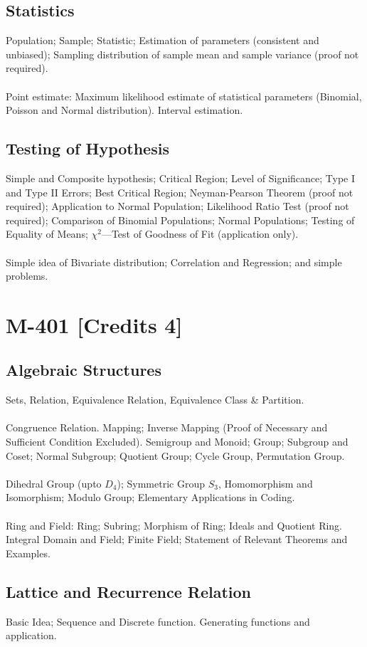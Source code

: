 \documentclass[12pt]{article}
\begin{document}
\subsection{Statistics}
Population; Sample; Statistic; Estimation of parameters (consistent and unbiased); Sampling distribution of sample mean and sample variance (proof not required).\\ \\
Point  estimate: Maximum likelihood estimate of statistical parameters (Binomial, Poisson and Normal distribution). Interval estimation.
\subsection{Testing of Hypothesis}
Simple  and  Composite  hypothesis; Critical Region; Level of Significance; Type I and Type II Errors; Best Critical  Region;  Neyman-Pearson  Theorem  (proof  not required);  Application  to  Normal  Population; Likelihood Ratio Test (proof not required); Comparison of Binomial Populations; Normal Populations; Testing of Equality of Means; $\chi^2$—Test of Goodness of Fit (application only).\\ \\
Simple idea of Bivariate distribution; Correlation and Regression; and simple problems. 

\section{M-401 [Credits 4]}
\subsection{Algebraic Structures}
Sets, Relation, Equivalence Relation, Equivalence Class \& Partition.\\ \\
Congruence Relation. Mapping; Inverse Mapping (Proof of Necessary and Sufficient Condition Excluded). Semigroup and Monoid; Group; Subgroup and Coset; Normal Subgroup; Quotient Group; Cycle Group, Permutation Group.\\ \\
Dihedral Group (upto $D_4$); Symmetric Group $S_3$, Homomorphism and Isomorphism; Modulo Group; Elementary Applications in Coding.\\ \\
Ring and Field: Ring; Subring; Morphism of Ring; Ideals and Quotient Ring. Integral Domain and Field; Finite Field; Statement of Relevant Theorems and  Examples.
\subsection{Lattice and Recurrence Relation}
Basic Idea; Sequence and Discrete function. Generating functions and application. 
\end{document}
